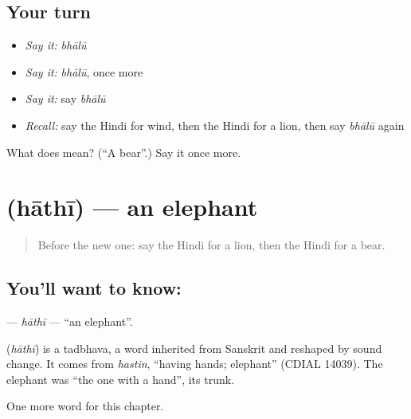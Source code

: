 \subsection*{Your turn}
\begin{itemize}
\raggedright
  \item \emph{Say it:} \emph{bhālū}
  \item \emph{Say it:} \emph{bhālū}, once more
  \item \emph{Say it:} say \emph{bhālū}
  \item \emph{Recall:} say the Hindi for wind, then the Hindi for a lion, then say \emph{bhālū} again
\end{itemize}

\begin{tcolorbox}[breakable,colback=teal!4,colframe=teal!35!black,title={Before you move on}]
What does  mean? (\textquotedblleft{}A bear\textquotedblright{}.) Say it once more.
\end{tcolorbox}
\section[\texorpdfstring{\hi{हाथी} (hāthī)}{हाथी (hāthī)}]{ (hāthī) — an elephant}

\label{lesson:HI-C146-hathi}



\begin{quote}
Before the new one: say the Hindi for a lion, then the Hindi for a bear.
\end{quote}

\subsection*{You'll want to know: }
\textbf{} — \emph{hāthī} — \textquotedblleft{}an elephant\textquotedblright{}.

\begin{cousinweb}
\textbf{} (\emph{hāthī}) is a tadbhava, a word inherited from Sanskrit and reshaped by sound change. It comes from \emph{hastin}, \textquotedblleft{}having hands; elephant\textquotedblright{} (CDIAL 14039). The elephant was \textquotedblleft{}the one with a hand\textquotedblright{}, its trunk.
\end{cousinweb}

\begin{grammarlens}[title={What you've built}]
One more word for this chapter.
\end{grammarlens}

